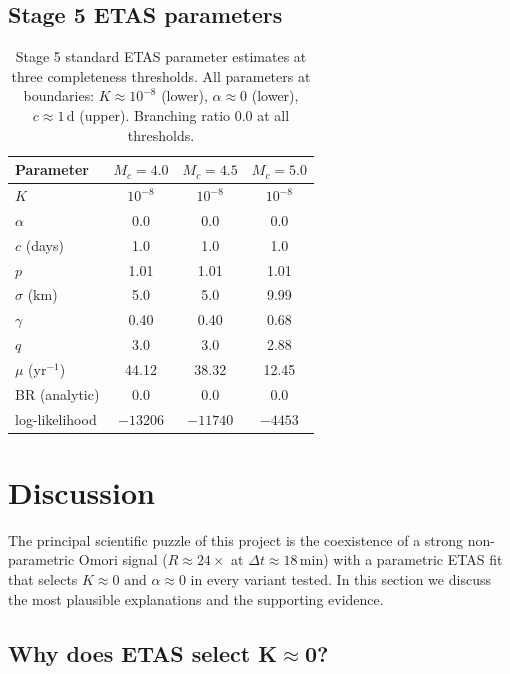 \documentclass[10pt,a4paper,twocolumn]{article}
\begin{document}
\subsection{Stage 5 ETAS parameters}

\begin{table}[t]
\centering
\caption{Stage 5 standard ETAS parameter estimates at three completeness thresholds. All parameters at boundaries: $K\approx10^{-8}$ (lower), $\alpha\approx0$ (lower), $c\approx1$\,d (upper). Branching ratio 0.0 at all thresholds.}\label{tab:stage5-etas}
\small
\begin{tabular*}{\columnwidth}{@{\extracolsep{\fill}}lccc}
\toprule
Parameter & $M_c=4.0$ & $M_c=4.5$ & $M_c=5.0$ \\
\midrule
$K$ & $10^{-8}$ & $10^{-8}$ & $10^{-8}$ \\
$\alpha$ & 0.0 & 0.0 & 0.0 \\
$c$ (days) & 1.0 & 1.0 & 1.0 \\
$p$ & 1.01 & 1.01 & 1.01 \\
$\sigma$ (km) & 5.0 & 5.0 & 9.99 \\
$\gamma$ & 0.40 & 0.40 & 0.68 \\
$q$ & 3.0 & 3.0 & 2.88 \\
$\mu$ (yr$^{-1}$) & 44.12 & 38.32 & 12.45 \\
BR (analytic) & 0.0 & 0.0 & 0.0 \\
log-likelihood & $-13206$ & $-11740$ & $-4453$ \\
\bottomrule
\end{tabular*}
\end{table}

\section{Discussion}\label{sec:discussion}

The principal scientific puzzle of this project is the coexistence of a strong non-parametric Omori signal ($R\approx24\times$ at $\Delta t\approx18$\,min) with a parametric ETAS fit that selects $K\approx0$ and $\alpha\approx0$ in every variant tested. In this section we discuss the most plausible explanations and the supporting evidence.

\subsection{Why does ETAS select K$\approx$0?}
\end{document}
